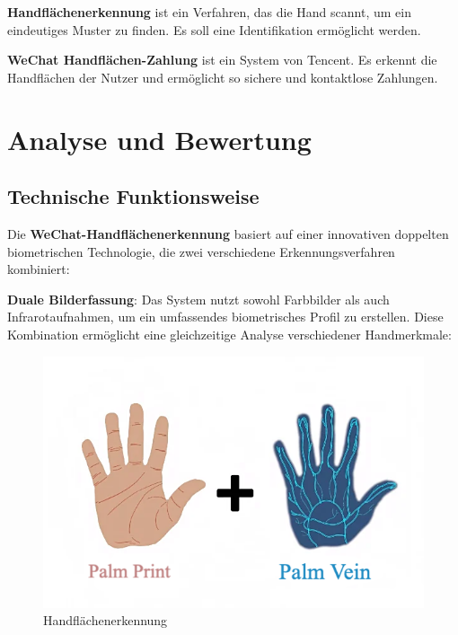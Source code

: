 \documentclass[paper=a4,fontsize=12pt,ngerman]{scrartcl}
\begin{document}
\textbf{Handflächenerkennung} ist ein Verfahren, das die Hand scannt, um ein eindeutiges Muster zu finden. Es soll eine Identifikation ermöglicht werden. \cite{innovatrics2025palm}

\textbf{WeChat Handflächen-Zahlung}  ist ein System von Tencent. Es erkennt die Handflächen der Nutzer und ermöglicht so sichere und kontaktlose Zahlungen. \cite{tencent2024palm}

\vspace{2cm}

\section{Analyse und Bewertung}

\subsection{Technische Funktionsweise}
Die \textbf{WeChat-Handflächenerkennung} basiert auf einer innovativen doppelten 
biometrischen Technologie, die zwei verschiedene Erkennungsverfahren kombiniert:

\textbf{Duale Bilderfassung}: Das System nutzt sowohl Farbbilder als auch 
Infrarotaufnahmen, um ein umfassendes biometrisches Profil zu erstellen. Diese 
Kombination ermöglicht eine gleichzeitige Analyse verschiedener Handmerkmale:

\begin{figure}[h]
\begin{center}
  \includegraphics[scale=0.35]{graphics/palm.png}
  \caption{Handflächenerkennung}
  \label{handfläche}
\end{center}
\end{figure}
\end{document}
